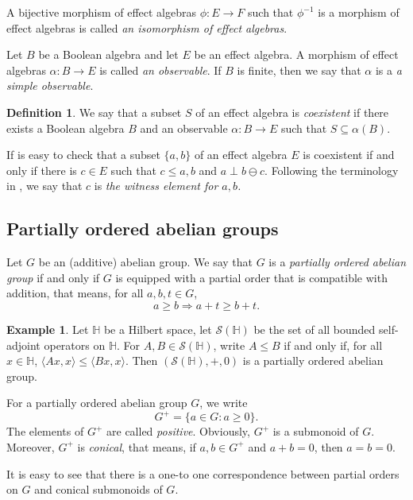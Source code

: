 \documentclass[letterpaper]{amsart}
\theoremstyle{definition}
\newtheorem{definition}{Definition}
\newtheorem{example}{Example}
\begin{document}
A bijective morphism of effect algebras $\phi:E\to F$ such that $\phi^{-1}$ is a
morphism of effect algebras is called {\em an isomorphism of effect algebras}.

Let $B$ be a Boolean algebra and let $E$ be an effect algebra. A morphism of
effect algebras $\alpha:B\to E$ is called {\em an observable}. If $B$ is
finite, then we say that $\alpha$ is a {\em a simple observable}.

\begin{definition}
We say that a subset $S$ of an effect algebra is {\em coexistent} if there exists
a Boolean algebra $B$ and an observable $\alpha:B\to E$ such that $S\subseteq\alpha(B)$.
\end{definition}

If is easy to check that a subset $\{a,b\}$ of an effect algebra $E$ is coexistent if and only if
there is $c\in E$ such that $c\leq a,b$ and $a\perp b\ominus c$. Following 
the terminology in \cite{Gud:CoQE},
we say that $c$ is {\em the witness element for $a,b$.}

\subsection{Partially ordered abelian groups}

Let $G$ be an (additive) abelian group. We say that $G$ is a {\em partially ordered abelian group} if and only if $G$ is equipped with a partial order that is compatible with addition,
that means, for all $a,b,t\in G$,
$$
a\geq b\Longrightarrow a+t\geq b+t.
$$

\begin{example}\label{ex:selfadjoint}
Let $\mathbb H$ be a Hilbert space, let $\mathcal S(\mathbb H)$ be the
set of all bounded self-adjoint operators on $\mathbb H$. For 
$A,B\in\mathcal S(\mathbb H)$, write $A\leq B$ if and only if,
for all $x\in\mathbb H$, $\langle Ax,x\rangle\leq\langle Bx,x\rangle$.
Then $(\mathcal S(\mathbb H),+,0)$ is a partially ordered abelian group.
\end{example}

For a partially ordered abelian group $G$, we write 
$$
G^+=\{a\in G: a\geq 0\}.
$$
The elements of $G^+$ are called {\em positive}.
Obviously, $G^+$ is a submonoid of $G$. Moreover, $G^+$ is {\em conical}, that
means, if $a,b\in G^+$ and $a+b=0$, then $a=b=0$. 

It is easy to see that
there is a one-to one correspondence between partial orders on $G$ and conical 
submonoids of $G$.
\end{document}
